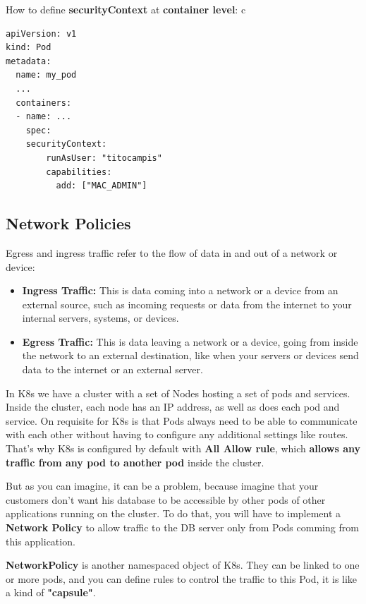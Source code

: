 \documentclass{article}
\newenvironment{codetemplate}[1][]{%
  \mybasecolorbox[#1]
  \itshape
}{%
  \endmybasecolorbox
}
\begin{document}
How to define \textbf{securityContext} at \textbf{container level}:
c\begin{codetemplate}{}
\begin{verbatim}
apiVersion: v1
kind: Pod
metadata:
  name: my_pod
  ...
  containers:
  - name: ...
    spec:
    securityContext:
        runAsUser: "titocampis"
        capabilities:
          add: ["MAC_ADMIN"]
\end{verbatim}
\end{codetemplate}

\subsection{Network Policies}
Egress and ingress traffic refer to the flow of data in and out of a network or device:
\begin{itemize}
    \item \textbf{Ingress Traffic:} This is data coming into a network or a device from an external source, such as incoming requests or data from the internet to your internal servers, systems, or devices.
    \item \textbf{Egress Traffic:} This is data leaving a network or a device, going from inside the network to an external destination, like when your servers or devices send data to the internet or an external server.
\end{itemize}

In K8s we have a cluster with a set of Nodes hosting a set of pods and services. Inside the cluster, each node has an IP address, as well as does each pod and service. On requisite for K8s is that Pods always need to be able to communicate with each other
without having to configure any additional settings like routes. That's why K8s is configured by default with \textbf{All Allow rule}, which \textbf{allows any traffic from any pod to another pod} inside the cluster.

But as you can imagine, it can be a problem, because imagine that your customers don't want his database to be accessible by other pods of other applications running on the cluster. To do that, you will have to implement a \textbf{Network Policy} to allow traffic to the DB server only from Pods comming from this application.

\textbf{NetworkPolicy} is another namespaced object of K8s. They can be linked to one or more pods, and you can define rules to control the traffic to this Pod, it is like a kind of \textbf{"capsule"}.
\end{document}
